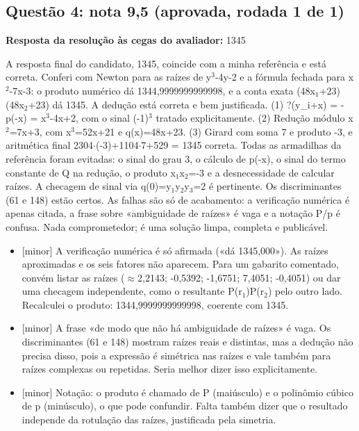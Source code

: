 \documentclass{article}%
\begin{document}
\subsection*{Questão 4: nota 9,5 (aprovada, rodada 1 de 1)}%
\textbf{Resposta da resolução às cegas do avaliador:} 1345\par %
A resposta final do candidato, 1345, coincide com a minha referência e está correta. Conferi com Newton para as raízes de y$^3$-4y-2 e a fórmula fechada para x$^2$-7x-3: o produto numérico dá 1344,9999999999998, e a conta exata (48x$_{1}$+23)(48x$_{2}$+23) dá 1345. A dedução está correta e bem justificada. (1) ?(y\_i+x) = -p(-x) = x$^3$-4x+2, com o sinal (-1)$^3$ tratado explicitamente. (2) Redução módulo x$^2$=7x+3, com x$^3$=52x+21 e q(x)=48x+23. (3) Girard com soma 7 e produto -3, e aritmética final 2304$\cdot$(-3)+1104$\cdot$7+529 = 1345 correta. Todas as armadilhas da referência foram evitadas: o sinal do grau 3, o cálculo de p(-x), o sinal do termo constante de Q na redução, o produto x$_{1}$x$_{2}$=-3 e a desnecessidade de calcular raízes. A checagem de sinal via q(0)=y$_{1}$y$_{2}$y$_{3}$=2 é pertinente. Os discriminantes (61 e 148) estão certos. As falhas são só de acabamento: a verificação numérica é apenas citada, a frase sobre «ambiguidade de raízes» é vaga e a notação P/p é confusa. Nada comprometedor; é uma solução limpa, completa e publicável.%
\begin{itemize}%
\item%
{[}minor{]} A verificação numérica é só afirmada («dá 1345,000»). As raízes aproximadas e os seis fatores não aparecem. Para um gabarito comentado, convém listar as raízes ($\approx$2,2143; -0,5392; -1,6751; 7,4051; -0,4051) ou dar uma checagem independente, como o resultante P(r$_{1}$)P(r$_{2}$) pelo outro lado. Recalculei o produto: 1344,9999999999998, coerente com 1345.%
\item%
{[}minor{]} A frase «de modo que não há ambiguidade de raízes» é vaga. Os discriminantes (61 e 148) mostram raízes reais e distintas, mas a dedução não precisa disso, pois a expressão é simétrica nas raízes e vale também para raízes complexas ou repetidas. Seria melhor dizer isso explicitamente.%
\item%
{[}minor{]} Notação: o produto é chamado de P (maiúsculo) e o polinômio cúbico de p (minúsculo), o que pode confundir. Falta também dizer que o resultado independe da rotulação das raízes, justificada pela simetria.%
\end{itemize}%
\end{document}

